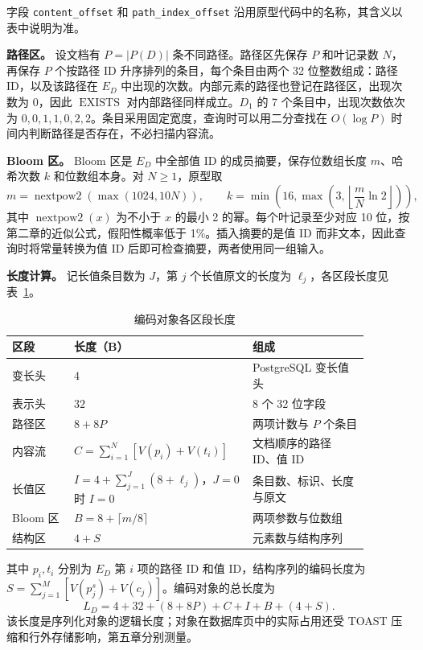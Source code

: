 字段 \texttt{content\_offset} 和 \texttt{path\_index\_offset} 沿用原型代码中的名称，其含义以表中说明为准。

\textbf{路径区。} 设文档有 $P=|P(D)|$ 条不同路径。路径区先保存 $P$ 和叶记录数 $N$，再保存 $P$ 个按路径 ID 升序排列的条目，每个条目由两个 32 位整数组成：路径 ID，以及该路径在 $E_D$ 中出现的次数。内部元素的路径也登记在路径区，出现次数为 0，因此 $\operatorname{EXISTS}$ 对内部路径同样成立。$D_1$ 的 7 个条目中，出现次数依次为 $0,0,1,1,0,2,2$。条目采用固定宽度，查询时可以用二分查找在 $O(\log P)$ 时间内判断路径是否存在，不必扫描内容流。

\textbf{Bloom 区。} Bloom 区是 $E_D$ 中全部值 ID 的成员摘要，保存位数组长度 $m$、哈希次数 $k$ 和位数组本身。对 $N\ge1$，原型取
\[
m=\operatorname{nextpow2}(\max(1024,10N)),\qquad
k=\min\left(16,\max\left(3,\left\lfloor\frac{m}{N}\ln 2\right\rfloor\right)\right),
\]
其中 $\operatorname{nextpow2}(x)$ 为不小于 $x$ 的最小 2 的幂。每个叶记录至少对应 10 位，按第二章的近似公式，假阳性概率低于 1\%。插入摘要的是值 ID 而非文本，因此查询时将常量转换为值 ID 后即可检查摘要，两者使用同一组输入。

\textbf{长度计算。} 记长值条目数为 $J$，第 $j$ 个长值原文的长度为 $\ell_j$，各区段长度见表~\ref{tab:binary-length}。

\begin{table}[htbp]
\centering\small
\caption{编码对象各区段长度}
\label{tab:binary-layout}\label{tab:binary-length}
\begin{tabular}{p{0.16\linewidth}p{0.42\linewidth}p{0.30\linewidth}}
\toprule
区段 & 长度（B） & 组成 \\
\midrule
变长头 & $4$ & PostgreSQL 变长值头 \\
表示头 & $32$ & 8 个 32 位字段 \\
路径区 & $8+8P$ & 两项计数与 $P$ 个条目 \\
内容流 & $C=\sum_{i=1}^{N}[V(p_i)+V(t_i)]$ & 文档顺序的路径 ID、值 ID \\
长值区 & $I=4+\sum_{j=1}^{J}(8+\ell_j)$，$J=0$ 时 $I=0$ & 条目数、标识、长度与原文 \\
Bloom 区 & $B=8+\lceil m/8\rceil$ & 两项参数与位数组 \\
结构区 & $4+S$ & 元素数与结构序列 \\
\bottomrule
\end{tabular}
\end{table}

其中 $p_i,t_i$ 分别为 $E_D$ 第 $i$ 项的路径 ID 和值 ID，结构序列的编码长度为 $S=\sum_{j=1}^{M}[V(p^{s}_j)+V(c_j)]$。编码对象的总长度为
\begin{equation}
L_D=4+32+(8+8P)+C+I+B+(4+S).
\label{eq:representation-size}
\end{equation}
该长度是序列化对象的逻辑长度；对象在数据库页中的实际占用还受 TOAST 压缩和行外存储影响，第五章分别测量\cite{pg16toast}。

